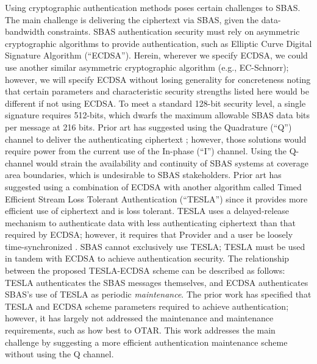 \documentclass[letterpaper,times]{IONconf/IONconf}
\begin{document}
Using cryptographic authentication methods poses certain challenges to SBAS.
The main challenge is delivering the ciphertext via SBAS, given the data-bandwidth constraints.
SBAS authentication security must rely on asymmetric cryptographic algorithms to provide authentication, such as Elliptic Curve Digital Signature Algorithm (``ECDSA'').
Herein, wherever we specify ECDSA, we could use another similar asymmetric cryptographic algorithm (e.g., EC-Schnorr); however, we will specify ECDSA without losing generality for concreteness noting that certain parameters and characteristic security strengths listed here would be different if not using ECDSA.
To meet a standard 128-bit security level, a single signature requires 512-bits, which dwarfs the maximum allowable SBAS data bits per message at 216 bits.
Prior art has suggested using the Quadrature (``Q'') channel to deliver the authenticating ciphertext \cite{other_schemes}; however, those solutions would require power from the current use of the In-phase (``I'') channel.
Using the Q-channel would strain the availability and continuity of SBAS systems at coverage area boundaries, which is undesirable to SBAS stakeholders.
Prior art has suggested using a combination of ECDSA with another algorithm called Timed Efficient Stream Loss Tolerant Authentication (``TESLA'') \cite{Neish_Dissertation} since it provides more efficient use of ciphertext and is loss tolerant.
TESLA uses a delayed-release mechanism to authenticate data with less authenticating ciphertext than that required by ECDSA; however, it requires that Provider and a user be loosely time-synchronized \cite{perrig2005timed}.
SBAS cannot exclusively use TESLA; TESLA must be used in tandem with ECDSA to achieve authentication security.
The relationship between the proposed TESLA-ECDSA scheme can be described as follows: TESLA authenticates the SBAS messages themselves, and ECDSA authenticates SBAS's use of TESLA as periodic {\em maintenance}.
The prior work has specified that TESLA and ECDSA scheme parameters required to achieve authentication; however, it has largely not addressed the maintenance and maintenance requirements, such as how best to OTAR.
This work addresses the main challenge by suggesting a more efficient authentication maintenance scheme without using the Q channel.
\end{document}
